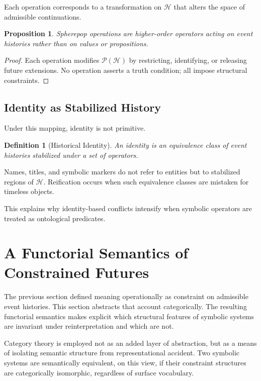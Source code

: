 \documentclass[11pt]{article}
\newtheorem{definition}{Definition}
\newtheorem{proposition}{Proposition}
\newcommand{\Hist}{\mathcal{H}}
\begin{document}
Each operation corresponds to a transformation on $\Hist$ that alters the space
of admissible continuations.

\begin{proposition}
Spherepop operations are higher-order operators acting on event histories rather
than on values or propositions.
\end{proposition}

\begin{proof}
Each operation modifies $\mathcal{P}(\Hist)$ by restricting, identifying, or
releasing future extensions. No operation asserts a truth condition; all impose
structural constraints.
\end{proof}

\subsection{Identity as Stabilized History}

Under this mapping, identity is not primitive.

\begin{definition}[Historical Identity]
An identity is an equivalence class of event histories stabilized under a set of
operators.
\end{definition}

Names, titles, and symbolic markers do not refer to entities but to stabilized
regions of $\Hist$. Reification occurs when such equivalence classes are mistaken
for timeless objects.

This explains why identity-based conflicts intensify when symbolic operators are
treated as ontological predicates.


\section{A Functorial Semantics of Constrained Futures}

The previous section defined meaning operationally as constraint on admissible
event histories. This section abstracts that account categorically. The resulting
functorial semantics makes explicit which structural features of symbolic systems
are invariant under reinterpretation and which are not.

Category theory is employed not as an added layer of abstraction, but as a means
of isolating semantic structure from representational accident. Two symbolic
systems are semantically equivalent, on this view, if their constraint structures
are categorically isomorphic, regardless of surface vocabulary.
\end{document}

